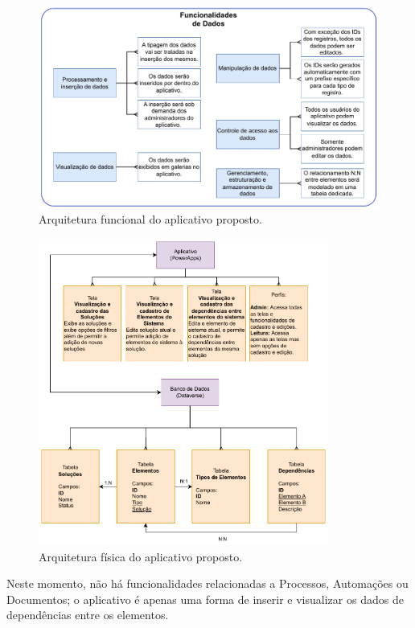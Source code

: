 	\begin{figure}[!h]
		\centering
		\includegraphics[width=1\textwidth]{./figuras/appRastreabilidadeArqFunc.pdf}
		\caption{Arquitetura funcional do aplicativo proposto.}
		\label{fig:metodologia:appRastreabilidadeArqFunc}
	\end{figure}

	\begin{figure}[!h]
		\centering
		\includegraphics[width=0.85\textwidth]{./figuras/appRastreabilidadeArqFis.pdf}
		\caption{Arquitetura física do aplicativo proposto.}
		\label{fig:metodologia:appRastreabilidadeArqFis}
	\end{figure}

	Neste momento, não há funcionalidades relacionadas a Processos, Automações ou Documentos; o aplicativo é apenas uma forma de inserir e visualizar os dados de dependências entre os elementos.

